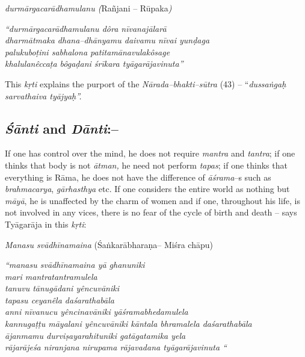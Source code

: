 \textit{durmārgacarādhamulanu (}Rañjani – Rūpaka\textit{)}

\begin{myquote}
\textit{“durmārgacarādhamulanu dôra nīvanajālarā}\\\textit{dharmātmaka dhana–dhānyamu daivamu nīvai yunḍaga}\\\textit{palukuboṭini sabhalona patitamānavulakôsage}\\\textit{khalulanêccaṭa bôgaḍani śrīkara tyāgarājavinuta”}
\end{myquote}

This \textit{kṛti} explains the purport of the \textit{Nārada–bhakti–sūtra} (43) – “\textit{dussaṅgaḥ sarvathaiva tyājyaḥ”.}

\vspace{-.3cm}

\subsection*{\textit{Śānti} and \textit{Dānti}:–}

\vspace{-.3cm}

If one has control over the mind, he does not require \textit{mantra} and \textit{tantra}; if one thinks that body is not \textit{ātman,} he need not perform \textit{tapas}; if one thinks that everything is Rāma, he does not have the difference of \textit{āśrama}–s such as \textit{brahmacarya}, \textit{gārhasthya} etc. If one considers the entire world as nothing but \textit{māyā}, he is unaffected by the charm of women and if one, throughout his life, is not involved in any vices, there is no fear of the cycle of birth and death – says Tyāgarāja in this \textit{kṛti}:

\textit{Manasu svādhīnamaina} (Śaṅkarābharaṇa– Miśra chāpu)

\begin{myquote}
\textit{“manasu svādhīnamaina yā ghanuniki}\\\textit{mari mantratantramulela}\\\textit{tanuvu tānugādani yêncuvāniki}\\\textit{tapasu ceyanêla daśarathabāla}\\\textit{anni nīvanucu yêncinavāniki yāśramabhedamulela}\\\textit{kannugaṭṭu māyalani yêncuvāniki kāntala bhramalela daśarathabāla}\\\textit{ājanmamu durviṣayarahituniki gatāgatamika yela}\\\textit{rājarājeśa niranjana nirupama rājavadana tyāgarājavinuta “}
\end{myquote}

